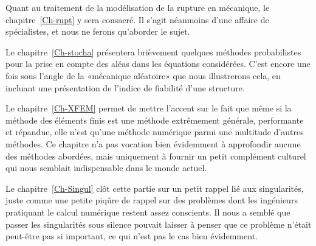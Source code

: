 \medskip
Quant au traitement de la modélisation de la rupture en mécanique, le chapitre~\ref{Ch-rupt} y sera consacré. Il s'agit néanmoins d'une affaire de spécialistes, et nous ne ferons qu'aborder le sujet.

\medskip
Le chapitre~\ref{Ch-stocha} présentera brièvement quelques méthodes probabilistes pour la prise en compte des aléas dans les équations considérées. C'est encore une fois sous l'angle de la «mécanique aléatoire» que nous illustrerons cela, en incluant une présentation de l'indice de fiabilité d'une structure.

\medskip
Le chapitre~\ref{Ch-XFEM} permet de mettre l'accent sur le fait que même si la méthode des éléments finis est une méthode extrêmement générale, performante et répandue, elle n'est qu'une méthode numérique parmi une multitude d'autres méthodes.
Ce chapitre n'a pas vocation bien évidemment à approfondir aucune des méthodes abordées, mais uniquement à fournir un petit complément culturel qui nous semblait indispensable dans le monde actuel.

\medskip
Le chapitre~\ref{Ch-Singul} clôt cette partie sur un petit rappel lié aux singularités, juste comme une petite piqûre de rappel sur des problèmes dont les ingénieurs pratiquant le calcul numérique restent assez conscients. Il nous a semblé que passer les singularités sous silence pouvait laisser à penser que ce problème n'était peut-être pas si important, ce qui n'est pas le cas bien évidemment.





